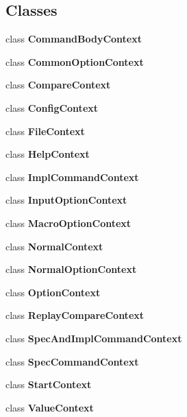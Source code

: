\subsection*{Classes}
\begin{DoxyCompactItemize}
\item 
class {\bfseries Command\+Body\+Context}
\item 
class {\bfseries Common\+Option\+Context}
\item 
class {\bfseries Compare\+Context}
\item 
class {\bfseries Config\+Context}
\item 
class {\bfseries File\+Context}
\item 
class {\bfseries Help\+Context}
\item 
class {\bfseries Impl\+Command\+Context}
\item 
class {\bfseries Input\+Option\+Context}
\item 
class {\bfseries Macro\+Option\+Context}
\item 
class {\bfseries Normal\+Context}
\item 
class {\bfseries Normal\+Option\+Context}
\item 
class {\bfseries Option\+Context}
\item 
class {\bfseries Replay\+Compare\+Context}
\item 
class {\bfseries Spec\+And\+Impl\+Command\+Context}
\item 
class {\bfseries Spec\+Command\+Context}
\item 
class {\bfseries Start\+Context}
\item 
class {\bfseries Value\+Context}
\end{DoxyCompactItemize}

